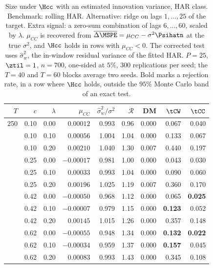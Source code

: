 \begin{table}[htbp]
\centering
\caption{Size under $\Hcc$ with an estimated innovation variance, HAR class. Benchmark: rolling HAR. Alternative: ridge on lags $1,\dots,25$ of the target. Extra signal: a zero-sum combination of lags $6,\dots,60$, scaled by $\lambda$. $\mu_{CC}$ is recovered from $\overline{\Delta\MSPE}=\mu_{CC}-\sigma^2\Psihatn$ at the true $\sigma^2$, and $\Hcc$ holds in rows with $\mu_{CC}<0$. The corrected test uses $\hat\sigma^2_w$, the in-window residual variance of the fitted HAR. $P=25$, $\ztil=1$, $n=700$, one-sided at $5\%$, $300$ replications per seed; the $T=40$ and $T=60$ blocks average two seeds. Bold marks a rejection rate, in a row where $\Hcc$ holds, outside the $95\%$ Monte Carlo band of an exact test.}
\label{tab:har-omitted}
\small
\setlength{\tabcolsep}{5pt}
\begin{tabular}{rrrrrrrrr}
\toprule
$T$ & $c$ & $\lambda$ & $\mu_{CC}$ & $\hat\sigma^2_w/\sigma^2$ & $\mathcal R$ & DM & $\tCW$ & $\tCC$ \\
\midrule
250 & 0.10 & 0.00 & $0.00012$ & 0.993 & 0.96 & 0.000 & 0.067 & 0.040 \\
 & 0.10 & 0.10 & $0.00056$ & 1.004 & 1.04 & 0.000 & 0.133 & 0.067 \\
 & 0.10 & 0.20 & $0.00210$ & 1.040 & 1.30 & 0.007 & 0.440 & 0.197 \\
\addlinespace
100 & 0.25 & 0.00 & $-0.00017$ & 0.981 & 1.00 & 0.000 & 0.043 & 0.030 \\
 & 0.25 & 0.10 & $0.00033$ & 0.993 & 1.04 & 0.000 & 0.090 & 0.060 \\
 & 0.25 & 0.20 & $0.00196$ & 1.025 & 1.19 & 0.007 & 0.360 & 0.170 \\
\addlinespace
60 & 0.42 & 0.00 & $-0.00050$ & 0.968 & 1.12 & 0.000 & 0.065 & \textbf{0.025} \\
 & 0.42 & 0.10 & $-0.00007$ & 0.979 & 1.15 & 0.000 & \textbf{0.123} & 0.052 \\
 & 0.42 & 0.20 & $0.00145$ & 1.015 & 1.26 & 0.000 & 0.357 & 0.148 \\
\addlinespace
40 & 0.62 & 0.00 & $-0.00055$ & 0.948 & 1.34 & 0.000 & \textbf{0.132} & \textbf{0.022} \\
 & 0.62 & 0.10 & $-0.00034$ & 0.959 & 1.37 & 0.000 & \textbf{0.157} & 0.045 \\
 & 0.62 & 0.20 & $0.00083$ & 0.993 & 1.43 & 0.000 & 0.345 & 0.108 \\
\bottomrule
\end{tabular}
\end{table}
